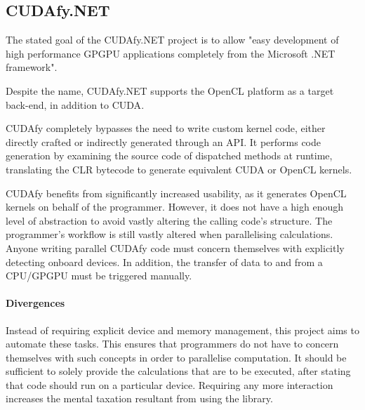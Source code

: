\subsection{CUDAfy.NET}
The stated goal of the CUDAfy.NET\cite{cudafy} project is to allow "easy development of high performance \ac{GPGPU} applications completely from the Microsoft .NET framework".

Despite the name, CUDAfy.NET supports the \ac{OpenCL} platform as a target back-end, in addition to \ac{CUDA}.

CUDAfy completely bypasses the need to write custom kernel code, either directly crafted or indirectly generated through an API. It performs code generation by examining the source code of dispatched methods at runtime, translating the \ac{CLR} bytecode to generate equivalent \ac{CUDA} or \ac{OpenCL} kernels.

CUDAfy benefits from significantly increased usability, as it generates \ac{OpenCL} kernels on behalf of the programmer. However, it does not have a high enough level of abstraction to avoid vastly altering the calling code's structure. The programmer's workflow is still vastly altered when parallelising calculations. Anyone writing parallel CUDAfy code must concern themselves with explicitly detecting onboard devices. In addition, the transfer of data to and from a \ac{CPU}/\ac{GPGPU} must be triggered manually.

\paragraph*{Divergences}
Instead of requiring explicit device and memory management, this project aims to automate these tasks. This ensures that programmers do not have to concern themselves with such concepts in order to parallelise computation. It should be sufficient to solely provide the calculations that are to be executed, after stating that code should run on a particular device. Requiring any more interaction increases the mental taxation resultant from using the library.
